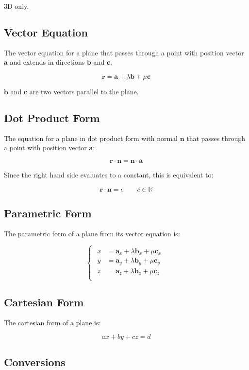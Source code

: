 \documentclass[a4paper,11pt]{article}
\newcommand{\bb}{\boldsymbol}
\begin{document}
3D only.


\subsection{Vector Equation}

The vector equation for a plane that passes through a point with position
vector $\bb{a}$ and extends in directions $\bb{b}$ and $\bb{c}$.

$$
\bb{r} = \bb{a} + \lambda \bb{b} + \mu \bb{c}
$$

$\bb{b}$ and $\bb{c}$ are two vectors parallel to the plane.


\subsection{Dot Product Form}

The equation for a plane in dot product form with normal $\bb{n}$ that passes
through a point with position vector $\bb{a}$:

$$
\bb{r} \cdot \bb{n} = \bb{n} \cdot \bb{a}
$$

Since the right hand side evaluates to a constant, this is equivalent to:

$$
\bb{r} \cdot \bb{n} = c \qquad c \in \mathbb{R}
$$


\subsection{Parametric Form}

The parametric form of a plane from its vector equation is:

$$
\begin{cases}
\begin{aligned}
x & = \bb{a}_x + \lambda \bb{b}_x + \mu \bb{c}_x \\
y & = \bb{a}_y + \lambda \bb{b}_y + \mu \bb{c}_y \\
z & = \bb{a}_z + \lambda \bb{b}_z + \mu \bb{c}_z \\
\end{aligned}
\end{cases}
$$


\subsection{Cartesian Form}

The cartesian form of a plane is:

$$
ax + by + cz = d
$$


\subsection{Conversions}
\end{document}
